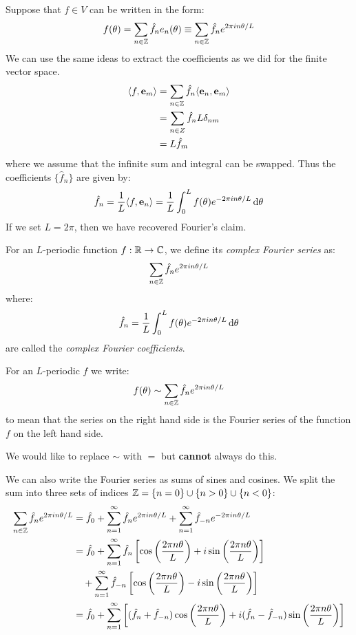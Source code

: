 \documentclass[../main.tex]{subfiles}
\begin{document}
Suppose that $f \in V$ can be written in the form:
\[
  f(\theta) = \sum_{n \in \mathbb{Z}} \hat{f}_n e_n(\theta) \equiv \sum_{n \in \mathbb{Z}} \hat{f}_{n} e^{2\pi i n \theta/L}
\]
We can use the same ideas to extract the coefficients as we did for the finite vector space.
\begin{align*}
  \langle f, \mathbf{\bm{e}}_m \rangle &= \sum_{n \in \mathbb{Z}} \hat{f}_n \langle \mathbf{\bm{e}}_n, \mathbf{\bm{e}}_m \rangle \\
                               &= \sum_{n \in Z} \hat{f}_n L \delta_{n m} \\
                               &= L \hat{f}_{m}
\end{align*}
where we assume that the infinite sum and integral can be swapped.
Thus the coefficients $\{\hat{f}_n\}$ are given by:
\[
  \hat{f}_n = \frac{1}{L} \langle f, \vec{e}_n \rangle = \frac{1}{L} \int_{0}^{L} f(\theta) e^{-2\pi i n \theta / L} \d{\theta}
\]
If we set $L = 2\pi$, then we have recovered Fourier's claim.
\begin{definition}
  For an $L$-periodic function $f: \mathbb{R} \to \mathbb{C}$, we define its \textit{complex Fourier series} as: \label{compFourier}
  \[
    \sum_{n \in \mathbb{Z}} \hat{f}_n e^{2\pi i n \theta / L}
  \]
  where:
  \[
    \hat{f}_n = \frac{1}{L} \int_{0}^{L} f(\theta) e^{-2\pi i n \theta / L} \d{\theta}
  \]
  are called the \textit{complex Fourier coefficients}.
\end{definition}
\begin{remark}[Notation]
  For an $L$-periodic $f$ we write:
  \[
    f(\theta) \sim \sum_{n \in \mathbb{Z}} \hat{f}_n e^{2\pi i n \theta / L}
  \]
  to mean that the series on the right hand side is the Fourier series of the function $f$ on the left hand side.

  We would like to replace $\sim$ with $=$ but \textbf{cannot} always do this.
\end{remark}
We can also write the Fourier series as sums of sines and cosines.
We split the sum into three sets of indices $\mathbb{Z} = \{n = 0\} \cup \{n > 0\} \cup \{n < 0\}$:
\begin{align*}
  \sum_{n \in \mathbb{Z}} \hat{f}_{n} e^{2\pi i n \theta / L} &= \hat{f}_0 + \sum_{n = 1}^{\infty} \hat{f}_{n} e^{2\pi i n \theta/L} + \sum_{n = 1}^{\infty} \hat{f}_{-n} e^{-2 \pi i n \theta/L} \\
                                                      &= \hat{f}_{0} + \sum_{n = 1}^{\infty} \hat{f}_{n} \left[\cos\left(\frac{2 \pi n \theta}{L}\right) + i \sin\left(\frac{2 \pi n \theta}{L}\right)\right] \\
                                                      &\quad+ \sum_{n = 1}^{\infty} \hat{f}_{-n} \left[\cos\left(\frac{2 \pi n \theta}{L}\right) - i \sin\left(\frac{2 \pi n \theta}{L}\right)\right] \\
                                                      &= \hat{f}_{0} + \sum_{n = 1}^{\infty} \left[(\hat{f}_{n} + \hat{f}_{-n}) \cos\left(\frac{2 \pi n \theta}{L}\right) + i(\hat{f}_{n} - \hat{f}_{-n}) \sin \left(\frac{2 \pi n \theta}{L}\right)\right]
\end{align*}
\end{document}

